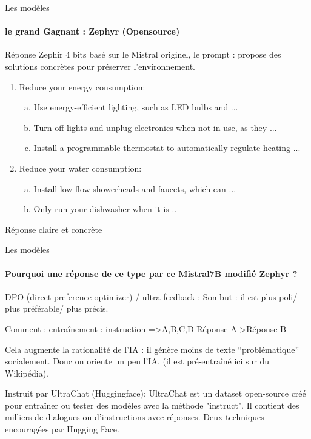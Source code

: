 \documentclass{beamer}
\begin{document}
\begin{frame}{Les modèles}
\framesubtitle{le grand Gagnant : Zephyr (Opensource)}


Réponse Zephir 4 bits basé sur le Mistral originel, le prompt : propose des solutions concrètes pour préserver l'environnement. 

\begin{enumerate}
    \item Reduce your energy consumption:
    \begin{enumerate}[a)] %
        \item Use energy-efficient lighting, such as LED bulbs and ...
        \item Turn off lights and unplug electronics when not in use, as they ...
        \item Install a programmable thermostat to automatically regulate heating ...
    \end{enumerate}
    \item Reduce your water consumption:
    \begin{enumerate}[a)] %
        \item Install low-flow showerheads and faucets, which can ...
        \item Only run your dishwasher when it is ..
    \end{enumerate}
\end{enumerate}

Réponse claire et concrète

\end{frame}


\begin{frame}{Les modèles}
\framesubtitle{Pourquoi une réponse de ce type par ce Mistral7B modifié Zephyr ?}

\begin{block}{DPO (direct preference optimizer) / ultra feedback :}
Son but : il est plus poli/ plus préférable/ plus précis. \newline

Comment : entraînement : instruction =>A,B,C,D Réponse A >Réponse B \newline 

Cela augmente la rationalité de l’IA  : il génère moins de texte “problématique” socialement. Donc on oriente un peu l’IA. (il est pré-entraîné ici sur du Wikipédia).
\end{block}

\begin{block}{Instruit par UltraChat (Huggingface):}
UltraChat est un dataset open-source créé pour entraîner ou tester des modèles avec la méthode "instruct". Il contient des milliers de dialogues ou d'instructions avec réponses. Deux techniques encouragées par Hugging Face.
\end{block}
    
\end{frame}
\end{document}

